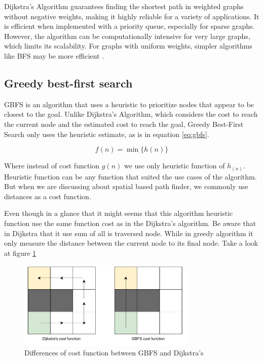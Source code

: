 \documentclass[12pt]{report}
\begin{document}
        Dijkstra's Algorithm guarantees finding the shortest path in weighted graphs without negative weights, making it
        highly reliable for a variety of applications. It is efficient when implemented with a priority queue,
        especially for sparse graphs. However, the algorithm can be computationally intensive for very large graphs,
        which limits its scalability. For graphs with uniform weights, simpler algorithms like BFS may be more efficient
        \cite{dijkstra_note_2022}.


        \pagebreak
        \subsection{Greedy best-first search}
        \ac{GBFS} is an algorithm that uses a heuristic to prioritize nodes that appear to be closest to
        the goal. Unlike Dijkstra's Algorithm, which considers the cost to reach the current node and the estimated cost
        to reach the goal, Greedy Best-First Search only uses the heuristic estimate, as is in equation \ref{eq:gbfs}.

        \begin{equation}\label{eq:gbfs}
            f(n) = \min_{} \{ h(n)\}
        \end{equation}

        Where instead of cost function \(g(n)\) we use only heuristic function of \(h_(n)\). Heuristic function can be
        any function that suited the use cases of the algorithm. But when we are discussing about spatial based path
        finder, we commonly use distances as a cost function. 

        Even though in a glance that it might seems that this algorithm heuristic function use the same function cost as
        in the Dijkstra's algorithm. Be aware that in Dijkstra that it use sum of all is traversed node. While in greedy
        algorithm it only measure the distance between the current node to its final node. Take a look at figure
        \ref{fig:greedybfs}

        \begin{figure}[H]
            \centering
            \includegraphics[width=0.75\textwidth]{General Image/OSM Drone-gbfs vs dijkstra.pdf}
            \caption{Differences of cost function between GBFS and Dijkstra's}
            \label{fig:greedybfs}
        \end{figure}
\end{document}
